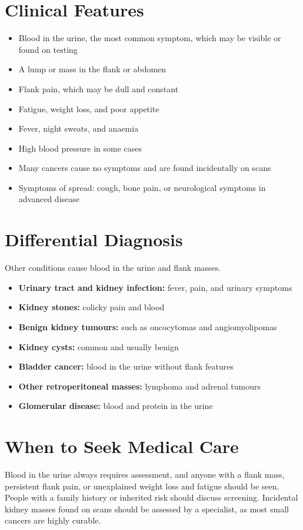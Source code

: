 \section*{Clinical Features}
\begin{itemize}
    \item Blood in the urine, the most common symptom, which may be visible or found on testing
    \item A lump or mass in the flank or abdomen
    \item Flank pain, which may be dull and constant
    \item Fatigue, weight loss, and poor appetite
    \item Fever, night sweats, and anaemia
    \item High blood pressure in some cases
    \item Many cancers cause no symptoms and are found incidentally on scans
    \item Symptoms of spread: cough, bone pain, or neurological symptoms in advanced disease
\end{itemize}

\section*{Differential Diagnosis}
Other conditions cause blood in the urine and flank masses.
\begin{itemize}
    \item \textbf{Urinary tract and kidney infection:} fever, pain, and urinary symptoms
    \item \textbf{Kidney stones:} colicky pain and blood
    \item \textbf{Benign kidney tumours:} such as oncocytomas and angiomyolipomas
    \item \textbf{Kidney cysts:} common and usually benign
    \item \textbf{Bladder cancer:} blood in the urine without flank features
    \item \textbf{Other retroperitoneal masses:} lymphoma and adrenal tumours
    \item \textbf{Glomerular disease:} blood and protein in the urine
\end{itemize}

\section*{When to Seek Medical Care}
Blood in the urine always requires assessment, and anyone with a flank mass, persistent flank pain, or unexplained weight loss and fatigue should be seen. People with a family history or inherited risk should discuss screening. Incidental kidney masses found on scans should be assessed by a specialist, as most small cancers are highly curable.

